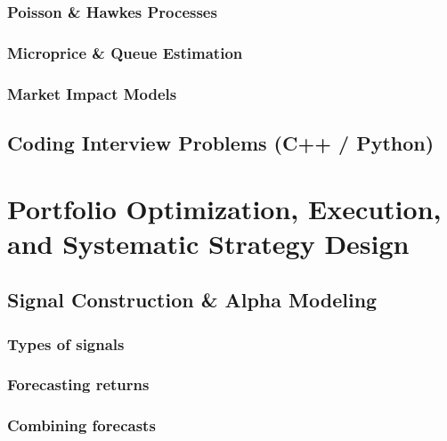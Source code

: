 \documentclass{report}
\begin{document}
\subsection*{Poisson \& Hawkes Processes}
\subsection*{Microprice \& Queue Estimation}
\subsection*{Market Impact Models}

\section{Coding Interview Problems (C++ / Python)}

\newpage

\chapter{Portfolio Optimization, Execution, and Systematic Strategy Design}

\section{Signal Construction \& Alpha Modeling}
\subsection*{Types of signals}
\subsection*{Forecasting returns}
\subsection*{Combining forecasts}
\end{document}
